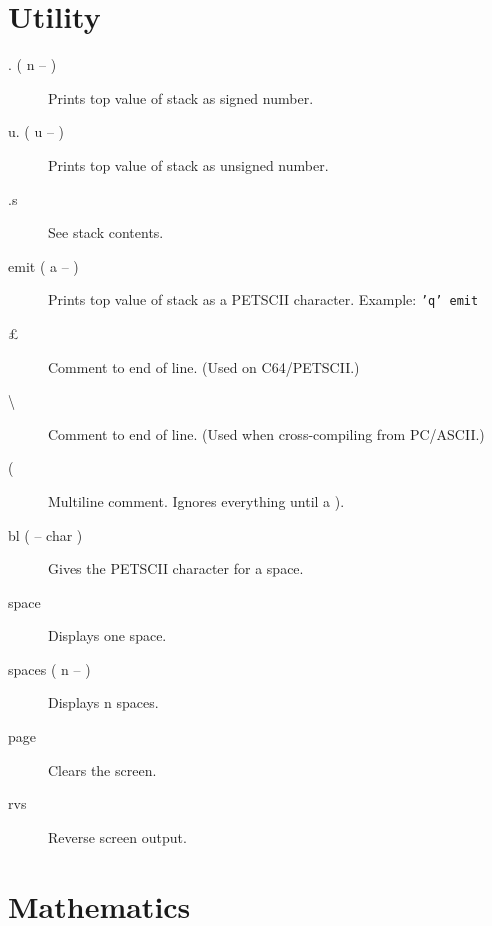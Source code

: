 \section{Utility}

\begin{description}
\item[. ( n -- )] Prints top value of stack as signed number.
\item[u. ( u -- )] Prints top value of stack as unsigned number.
\item[.s] See stack contents.
\item[emit ( a -- )] Prints top value of stack as a PETSCII character. Example: \texttt{'q' emit}
\item[\index{\pounds}\pounds] Comment to end of line. (Used on C64/PETSCII.)
\item[\index{\textbackslash}\textbackslash] Comment to end of line. (Used when cross-compiling from PC/ASCII.)
\item[\index{(}(] Multiline comment. Ignores everything until a ).
\item[bl ( -- char )] Gives the PETSCII character for a space.
\item[space] Displays one space.
\item[spaces ( n -- )] Displays n spaces.
\item[page] Clears the screen.
\item[rvs] Reverse screen output.
\end{description}

\section{Mathematics}

